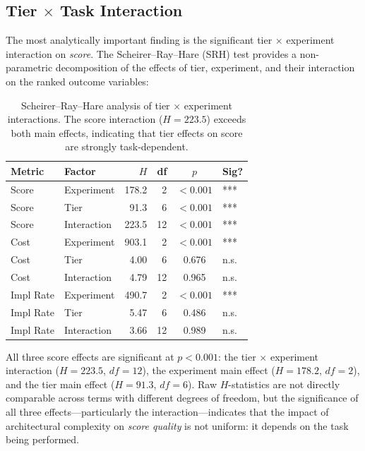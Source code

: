 \documentclass[11pt]{article}
\begin{document}
\subsection{Tier $\times$ Task Interaction}
\label{sec:interaction}

The most analytically important finding is the significant tier $\times$
experiment interaction on \emph{score}. The Scheirer--Ray--Hare (SRH) test
provides a non-parametric decomposition of the effects of tier, experiment,
and their interaction on the ranked outcome variables:

\begin{table}[htbp]
  \centering
  \caption{Scheirer--Ray--Hare analysis of tier $\times$ experiment
    interactions. The score interaction ($H=223.5$) exceeds both main
    effects, indicating that tier effects on score are strongly
    task-dependent.}
  \label{tab:srh}
  \small
  \begin{tabular}{llrrcl}
    \toprule
    Metric & Factor & $H$ & df & $p$ & Sig? \\
    \midrule
    Score & Experiment   & 178.2 & 2  & $<0.001$ & *** \\
    Score & Tier         &  91.3 & 6  & $<0.001$ & *** \\
    Score & Interaction  & 223.5 & 12 & $<0.001$ & *** \\
    \midrule
    Cost  & Experiment   & 903.1 & 2  & $<0.001$ & *** \\
    Cost  & Tier         &   4.00 & 6  & 0.676    & n.s. \\
    Cost  & Interaction  &   4.79 & 12 & 0.965    & n.s. \\
    \midrule
    Impl Rate & Experiment   & 490.7 & 2  & $<0.001$ & *** \\
    Impl Rate & Tier         &   5.47 & 6  & 0.486    & n.s. \\
    Impl Rate & Interaction  &   3.66 & 12 & 0.989    & n.s. \\
    \bottomrule
  \end{tabular}
\end{table}

All three score effects are significant at $p<0.001$: the tier $\times$
experiment interaction ($H=223.5$, $df=12$), the experiment main effect
($H=178.2$, $df=2$), and the tier main effect ($H=91.3$, $df=6$). Raw
$H$-statistics are not directly comparable across terms with different degrees
of freedom, but the significance of all three effects---particularly the
interaction---indicates that the impact of architectural complexity on
\emph{score quality} is not uniform: it depends on the task being performed.
\end{document}
